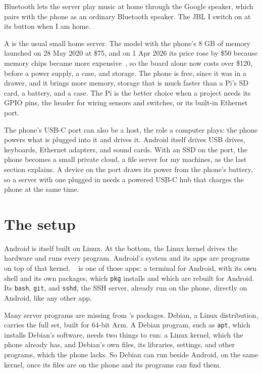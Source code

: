 \documentclass[11pt,a4paper]{article}
\begin{document}
 Bluetooth lets the server play music at home through the Google speaker, which pairs with the phone as an ordinary Bluetooth speaker. The JBL I switch on at its button when I am home.

A  is the usual small home server.  The model with the phone's 8 GB of memory launched on 28 May 2020 at \$75, and on 1 Apr 2026 its price rose by \$50 because memory chips became more expensive~\cite{rpi}, so the board alone now costs over \$120, before a power supply, a case, and storage. The phone is free, since it was in a drawer, and it brings more memory, storage that is much faster than a Pi's SD card, a battery, and a case. The Pi is the better choice when a project needs its GPIO pins, the header for wiring sensors and switches, or its built-in Ethernet port.

 The phone's USB-C port can also be a host, the role a computer plays: the phone powers what is plugged into it and drives it. Android itself drives USB drives, keyboards, Ethernet adapters, and sound cards. With an SSD on the port, the phone becomes a small private cloud, a file server for my machines, as the last section explains. A device on the port draws its power from the phone's battery, so a server with one plugged in needs a powered USB-C hub that charges the phone at the same time.

\section*{The setup}

 Android is itself built on Linux. At the bottom, the Linux kernel drives the hardware and runs every program. Android's system and its apps are programs on top of that kernel. ~\cite{termux} is one of those apps: a terminal for Android, with its own shell and its own packages, which \texttt{pkg} installs and which are rebuilt for Android. Its \texttt{bash}, \texttt{git}, and \texttt{sshd}, the SSH server, already run on the phone, directly on Android, like any other app.

Many server programs are missing from 's packages. Debian, a Linux distribution, carries the full set, built for 64-bit Arm. A Debian program, such as \texttt{apt}, which installs Debian's software, needs two things to run: a Linux kernel, which the phone already has, and Debian's own files, its libraries, settings, and other programs, which the phone lacks. So Debian can run beside Android, on the same kernel, once its files are on the phone and its programs can find them.
\end{document}
